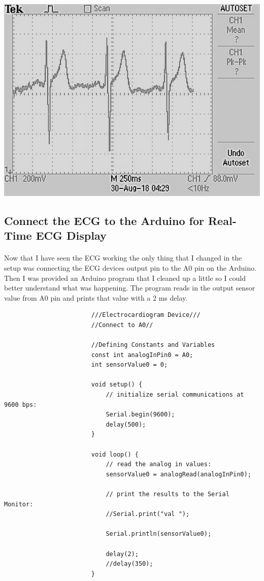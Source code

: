 \documentclass[12pt]{article}
\begin{document}
			\begin{center}
				\includegraphics[scale=1]{o_1.jpg}\\
			\end{center}
		
		\subsection{Connect the ECG to the Arduino for Real-Time ECG Display}
			\paragraph{}
				Now that I have seen the ECG working the only thing that I changed in the setup was 
				connecting the ECG devices output pin to the A0 pin on the Arduino.  Then I was provided 
				an Arduino program that I cleaned up a little so I could better understand what was happening.
				The program reads in the output sensor value from A0 pin and prints that value with a 2 ms
				delay.\\
				
				\begin{center}
					\begin{verbatim}
						///Electrocardiogram Device///
						//Connect to A0//

						//Defining Constants and Variables
						const int analogInPin0 = A0;  
						int sensorValue0 = 0;        

						void setup() {
							// initialize serial communications at 9600 bps:
							Serial.begin(9600);
							delay(500);
						}

						void loop() {
							// read the analog in values:
							sensorValue0 = analogRead(analogInPin0);
  
							// print the results to the Serial Monitor:
							//Serial.print("val ");
  
							Serial.println(sensorValue0);
  
							delay(2);
							//delay(350);
						}
					\end{verbatim}
				\end{center}
				
\end{document}
